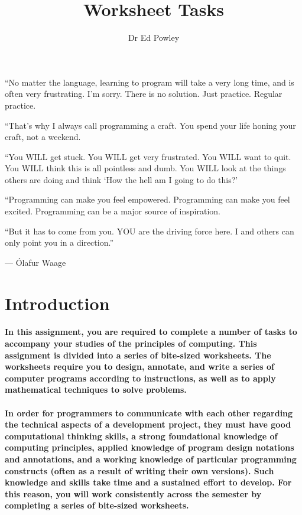 \documentclass{../../fal_assignment}
\title{Worksheet Tasks}
\author{Dr Ed Powley}
\begin{document}
\maketitle

\begin{marginquote}
``No matter the language, learning to program will take a very long time, and is often very frustrating. I'm sorry. There is no solution. Just practice. Regular practice.

``That's why I always call programming a craft. You spend your life honing your craft, not a weekend.

``You WILL get stuck.
You WILL get very frustrated.
You WILL want to quit.
You WILL think this is all pointless and dumb.
You WILL look at the things others are doing and think `How the hell am I going to do this?'

``Programming can make you feel empowered.
Programming can make you feel excited.
Programming can be a major source of inspiration.

``But it has to come from you. YOU are the driving force here. I and others can only point you in a direction.''

\par --- \'Olafur Waage
\end{marginquote}

\section*{Introduction}

\paragraph{In this assignment, you are required to complete a number of tasks to accompany your studies of the principles of computing. This assignment is divided into a series of bite-sized \textbf{worksheets}. The worksheets require you to \textbf{design}, \textbf{annotate}, and \textbf{write} a series of computer programs according to instructions, as well as to \textbf{apply} mathematical techniques to \textbf{solve} problems.}

\paragraph{In order for programmers to communicate with each other regarding the technical aspects of a development project, they must have good computational thinking skills, a strong foundational knowledge of computing principles, applied knowledge of program design notations and annotations, and a working knowledge of particular programming constructs (often as a result of writing their own versions). Such knowledge and skills take time and a sustained effort to develop. For this reason, you will work consistently across the semester by completing a series of bite-sized worksheets.}
\end{document}
